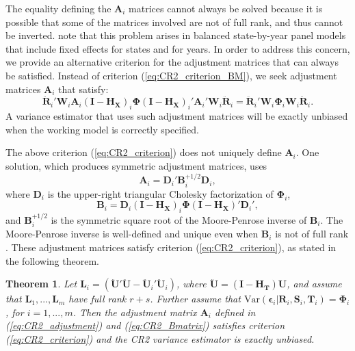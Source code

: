\documentclass[12pt]{article}
\newtheorem{thm}{Theorem}
\newcommand{\Var}{\text{Var}}
\newcommand{\bm}{\mathbf}
\newcommand{\bs}{\boldsymbol}
\begin{document}
The equality defining the $\bm{A}_i$ matrices cannot always be solved because it is possible that some of the matrices involved are not of full rank, and thus cannot be inverted. 
\citet{Angrist2009mostly} note that this problem arises in balanced state-by-year panel models that include fixed effects for states and for years. 
In order to address this concern, we provide an alternative criterion for the adjustment matrices that can always be satisfied. 
Instead of criterion (\ref{eq:CR2_criterion_BM}), we seek adjustment matrices $\bm{A}_i$ that satisfy:
\begin{equation}
\label{eq:CR2_criterion}
\bm{\ddot{R}}_i' \bm{W}_i \bm{A}_i \left(\bm{I} - \bm{H_X}\right)_i \bs\Phi \left(\bm{I} - \bm{H_X}\right)_i' \bm{A}_i' \bm{W}_i \bm{\ddot{R}}_i = \bm{\ddot{R}}_i' \bm{W}_i \bs\Phi_i \bm{W}_i \bm{\ddot{R}}_i.
\end{equation}
A variance estimator that uses such adjustment matrices will be exactly unbiased when the working model is correctly specified.

The above criterion (\ref{eq:CR2_criterion}) does not uniquely define $\bm{A}_i$. One solution, which produces symmetric adjustment matrices, uses
\begin{equation}
\label{eq:CR2_adjustment}
\bm{A}_i = \bm{D}_i' \bm{B}_i^{+1/2} \bm{D}_i,
\end{equation}
where $\bm{D}_i$ is the upper-right triangular Cholesky factorization of $\bs\Phi_i$, 
\begin{equation}
\label{eq:CR2_Bmatrix}
\bm{B}_i = \bm{D}_i\left(\bm{I} - \bm{H_X}\right)_i \bs\Phi \left(\bm{I} - \bm{H_X}\right)' \bm{D}_i',
\end{equation}
and $\bm{B}_i^{+1/2}$ is the symmetric square root of the Moore-Penrose inverse of $\bm{B}_i $. 
The Moore-Penrose inverse is well-defined and unique even when $\bm{B}_i$ is not of full rank \citep[][Thm. 9.18]{Banerjee2014linear}. These adjustment matrices satisfy criterion (\ref{eq:CR2_criterion}), as stated in the following theorem.

\begin{thm}
\label{thm:BRL_FE}
Let $\bm{L}_i = \left(\bm{\ddot{U}}'\bm{\ddot{U}} - \bm{\ddot{U}}_i'\bm{\ddot{U}}_i\right)$, where $\bm{\ddot{U}} = \left(\bm{I} - \bm{H_T}\right)\bm{U}$, and assume that $\bm{L}_1,...,\bm{L}_m$ have full rank $r + s$. Further assume that $\Var\left(\bs\epsilon_i\left|\bm{R}_i,\bm{S}_i,\bm{T}_i\right.\right) = \bs\Phi_i$, for $i = 1,...,m$. Then the adjustment matrix $\bm{A}_i$ defined in (\ref{eq:CR2_adjustment}) and (\ref{eq:CR2_Bmatrix}) satisfies criterion (\ref{eq:CR2_criterion}) and the CR2 variance estimator is exactly unbiased.
\end{thm}
\end{document}
